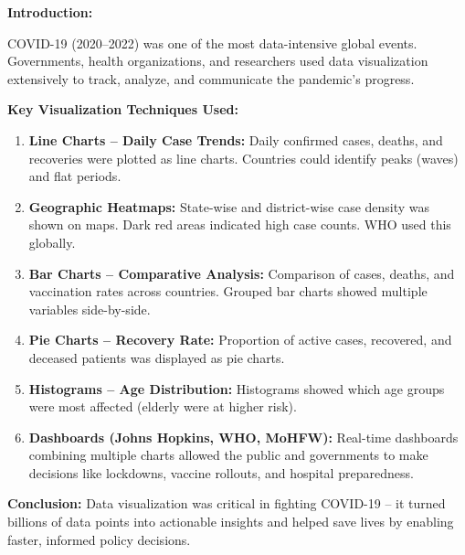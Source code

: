 \documentclass[12pt,a4paper]{article}
\newcommand{\term}[1]{\textbf{\color{headingcolor}#1}}
\begin{document}
\begin{answerenv}

\textbf{\color{headingcolor}Introduction:}

COVID-19 (2020--2022) was one of the most data-intensive global events. Governments, health organizations, and researchers used data visualization extensively to track, analyze, and communicate the pandemic's progress.

\vspace{6pt}
\textbf{\color{headingcolor}Key Visualization Techniques Used:}

\begin{enumerate}[leftmargin=1.8em, itemsep=5pt]
  \item \term{Line Charts -- Daily Case Trends:} Daily confirmed cases, deaths, and recoveries were plotted as line charts. Countries could identify peaks (waves) and flat periods.

  \item \term{Geographic Heatmaps:} State-wise and district-wise case density was shown on maps. Dark red areas indicated high case counts. WHO used this globally.

  \item \term{Bar Charts -- Comparative Analysis:} Comparison of cases, deaths, and vaccination rates across countries. Grouped bar charts showed multiple variables side-by-side.

  \item \term{Pie Charts -- Recovery Rate:} Proportion of active cases, recovered, and deceased patients was displayed as pie charts.

  \item \term{Histograms -- Age Distribution:} Histograms showed which age groups were most affected (elderly were at higher risk).

  \item \term{Dashboards (Johns Hopkins, WHO, MoHFW):} Real-time dashboards combining multiple charts allowed the public and governments to make decisions like lockdowns, vaccine rollouts, and hospital preparedness.
\end{enumerate}

\begin{keypoint}
\textbf{Conclusion:} Data visualization was critical in fighting COVID-19 -- it turned billions of data points into actionable insights and helped save lives by enabling faster, informed policy decisions.
\end{keypoint}

\end{answerenv}
\end{document}
